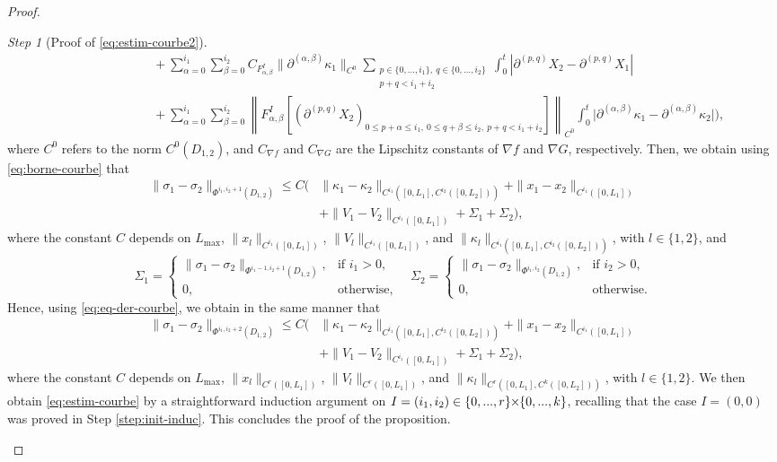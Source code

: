 \documentclass{article}
\newcommand{\Lmax}{L_{\max}}
\newcommand{\PLH}{{\mkern-1mu\times\mkern-1mu}}
\newcommand{\Times}{\PLH}
\newcommand{\ko}{\kappa}
\theoremstyle{remark}
\theoremstyle{prpart}
\newtheorem{proofpart}{Step}
\begin{document}
\begin{proof}
\begin{proofpart}[Proof of \eqref{eq:estim-courbe2}]
\begin{align*}
  &\qquad\qquad\qquad~~+\sum_{\alpha=0}^{i_1}\sum_{\beta=0}^{i_2}C_{F^I_{\alpha,\beta}} 
\|\partial^{(\alpha,\beta)}\ko_1\|_{C^0}\sum_{\substack{p\in\{0,...,i_1\},~q\in\{0,...,i_2\}\\p+q<i_1+i_2}}\int_0^t|\partial^{(p,q)}X_2-\partial^{(p,q)}X_1| \\
&\qquad\qquad\qquad~~+ \sum_{\alpha=0}^{i_1}\sum_{\beta=0}^{i_2}
\left\|F^I_{\alpha,\beta}\left[(\partial^{(p,q)}X_2)_{0\leq p+\alpha \leq i_1,~0\leq q+\beta\leq i_2,~p+q<i_1+i_2}\right]\right\|_{C^0}\int_0^t\big|\partial^{(\alpha,\beta)}\ko_1-\partial^{(\alpha,\beta)}\ko_2\big|\bigg),
\end{align*}
\normalsize
where $C^0$ refers to the norm $C^0(D_{1,2})$, and $C_{\nabla f}$ and $C_{\nabla G}$ are the Lipschitz constants of $\nabla f$ and $\nabla G$, respectively. Then, %
we obtain using \eqref{eq:borne-courbe} that %
\begin{align*}
  \|\sigma_1-\sigma_2\|_{\Phi^{i_1,i_2+1}(D_{1,2})} \leq C\Big(&\|\ko_1-\ko_2\|_{C^{i_1}([0,L_1],C^{i_2}([0,L_2]))} + \|x_1-x_2\|_{C^{i_1}([0,L_1])}\\
&  + \|V_1-V_2\|_{C^{i_1}([0,L_1])} + \Sigma_1+\Sigma_2\Big),
\end{align*}
where the constant $C$ depends on $\Lmax$, $\|x_l\|_{C^{i_1}([0,L_1])}$, $\|V_l\|_{C^{i_1}([0,L_1])}$, and $\|\ko_l\|_{C^{i_1}([0,L_1],C^{i_2}([0,L_2]))}$, with $l\in\{1,2\}$, and
\begin{equation*}
  \Sigma_1=\begin{cases}
    \|\sigma_1-\sigma_2\|_{\Phi^{i_1-1,i_2+1}(D_{1,2})},&\text{if $i_1>0$,}\\
    0, &\text{otherwise,}
\end{cases}\quad\Sigma_2=\begin{cases}
    \|\sigma_1-\sigma_2\|_{\Phi^{i_1,i_2}(D_{1,2})},&\text{if $i_2>0,$}\\
    0, &\text{otherwise}.
\end{cases}
\end{equation*}
Hence, using \eqref{eq:eq-der-courbe}, we obtain in the same manner that
\begin{align*}
  \|\sigma_1-\sigma_2\|_{\Phi^{i_1,i_2+2}(D_{1,2})} \leq C\Big(&\|\ko_1-\ko_2\|_{C^{i_1}([0,L_1],C^{i_2}([0,L_2]))} + \|x_1-x_2\|_{C^{i_1}([0,L_1])}\\
&  + \|V_1-V_2\|_{C^{i_1}([0,L_1])} + \Sigma_1+\Sigma_2\Big),
\end{align*}
where the constant $C$ depends on $\Lmax$, $\|x_l\|_{C^r([0,L_1])}$, $\|V_l\|_{C^r([0,L_1])}$, and $\|\ko_l\|_{C^r([0,L_1],C^k([0,L_2]))}$, with $l\in\{1,2\}$.
We then obtain \eqref{eq:estim-courbe} by a straightforward induction argument on $I=(i_1,i_2)\in\{0,...,r\}\Times\{0,...,k\}$, recalling that the case $I=(0,0)$ was proved in Step \ref{step:init-induc}. This concludes the proof of the proposition.
\end{proofpart}
\end{proof}
\end{document}
